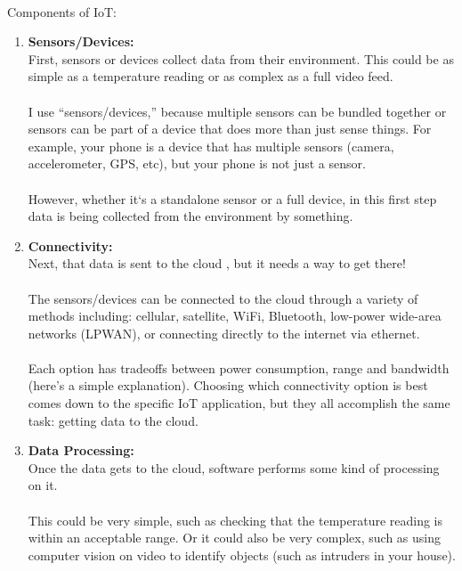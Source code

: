 \paragraph{} Components of IoT:
\begin{enumerate}
\item \textbf{Sensors/Devices:}\\
First, sensors or devices collect data from their environment. This could be as simple as a temperature reading or as complex as a full video feed.
\paragraph{}I use ``sensors/devices,” because multiple sensors can be bundled together or sensors can be part of a device that does more than just sense things. For example, your phone is a device that has multiple sensors (camera, accelerometer, GPS, etc), but your phone is not just a sensor.
\paragraph{}However, whether it`s a standalone sensor or a full device, in this first step data is being collected from the environment by something.
\item \textbf{Connectivity:}\\
Next, that data is sent to the cloud , but it needs a way to get there!
\paragraph{}The sensors/devices can be connected to the cloud through a variety of methods including: cellular, satellite, WiFi, Bluetooth, low-power wide-area networks (LPWAN), or connecting directly to the internet via ethernet.
\paragraph{}Each option has tradeoffs between power consumption, range and bandwidth (here’s a simple explanation). Choosing which connectivity option is best comes down to the specific IoT application, but they all accomplish the same task: getting data to the cloud.
\item \textbf{Data Processing:}\\
Once the data gets to the cloud, software performs some kind of processing on it.
\paragraph{}This could be very simple, such as checking that the temperature reading is within an acceptable range. Or it could also be very complex, such as using computer vision on video to identify objects (such as intruders in your house).

\end{enumerate}
